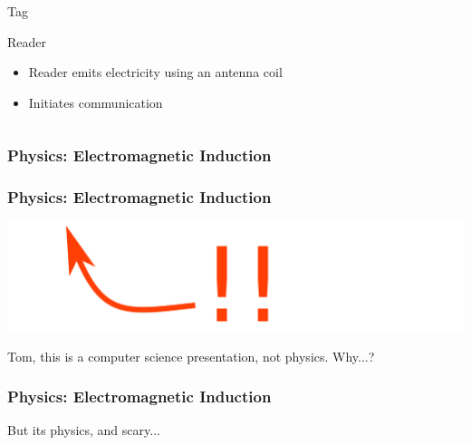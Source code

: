 \documentclass[unknownkeysallowed]{beamer}
\begin{document}
\begin{frame}
\begin{columns}[T]
\begin{column}{.5\textwidth}
\begin{block}{Tag}
\begin{itemize}
   		\end{itemize}
    	\end{block}
        \begin{block}{Reader}
    	\begin{itemize}
		    \item{Reader emits electricity using an antenna coil}
		    \item{Initiates communication}
   		\end{itemize}
    \end{block}
    \end{column}
  \end{columns}
\end{frame}

\begin{frame}
  \frametitle{Physics: Electromagnetic Induction}
\end{frame}
\begin{frame}
\frametitle{\textcolor{uipoppy}{Physics:} Electromagnetic Induction}
  \includegraphics[scale=.5]{figures/arrow.png}
  \begin{center}\begin{minipage}{.9\textwidth}
     \begin{block}{Tom, this is a computer science presentation, \newline not physics. Why...?}
     \end{block}
  \end{minipage}\end{center}
\end{frame}
\begin{frame}
\frametitle{Physics: Electromagnetic Induction}
  \begin{center}\begin{minipage}{.9\textwidth}
     \begin{block}{But its physics, and scary...}
     \end{block}
  \end{minipage}\end{center}
\end{frame}
\end{document}
